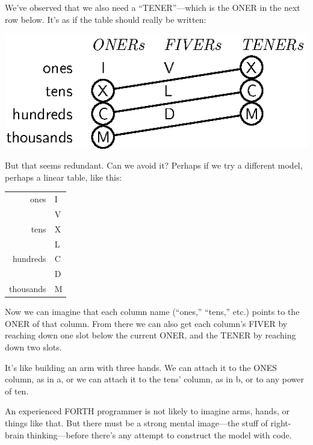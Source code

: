 We've observed that we also need a ``TENER''---which is the ONER in
the next row below. It's as if the table should really be written:

\bigskip
\includegraphics{inl4-1}
\bigskip

\noindent But that seems redundant. Can we avoid it? Perhaps if we try
a different model, perhaps a linear table, like this:

\bigskip
{\sf\begin{tabular}{rl}
ones      & I \\
          & V \\
tens      & X \\
          & L \\
hundreds  & C \\
          & D \\
thousands & M \\
\end{tabular}}
\bigskip

\noindent Now we can imagine that each column name (``ones,''
``tens,'' etc.) points to the ONER of that column. From there we can
also get each column's FIVER by reaching down one slot below the
current ONER, and the TENER by reaching down two slots.

It's like building an arm with three hands. We can attach it to the
ONES column, as in a, or we can attach it to the tens' column,
as in b, or to any power of ten.



An experienced FORTH programmer is not likely to imagine arms,
hands, or things like that. But there must be a strong mental image---the
stuff of right-brain thinking---before there's any attempt to construct the
model with code.

